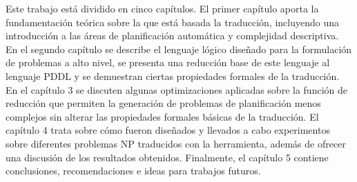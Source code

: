 Este trabajo está dividido en cinco capítulos. El primer capítulo aporta la
fundamentación teórica sobre la que está basada la traducción, incluyendo una
introducción a las áreas de planificación automática y complejidad descriptiva.
En el segundo capítulo se describe el lenguaje lógico diseñado para la
formulación de problemas a alto nivel, se presenta una reducción base de este
lenguaje al lenguaje PDDL y se demuestran ciertas propiedades formales de la
traducción. En el capítulo 3 se discuten algunas optimizaciones aplicadas sobre
la función de reducción que permiten la generación de problemas de
planificación menos complejos sin alterar las propiedades formales básicas de
la traducción. El capítulo 4 trata sobre cómo fueron diseñados y llevados a
cabo experimentos sobre diferentes problemas NP traducidos con la herramienta,
además de ofrecer una discusión de los resultados obtenidos. Finalmente, el
capítulo 5 contiene conclusiones, recomendaciones e ideas para trabajos
futuros.

%
